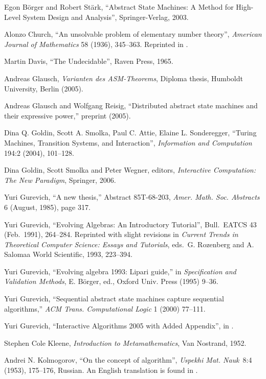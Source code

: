 \documentclass{LMCS}
\theoremstyle{definition}
\begin{document}
\begin{thebibliography}{99}
 Egon B\"orger and Robert St\"ark, ``Abstract State
Machines: A Method for High-Level System Design and Analysis'',
Springer-Verlag, 2003.

Alonzo Church, ``An unsolvable problem of
 elementary number theory'', {\it American Journal of Mathematics} 58
 (1936), 345--363.  Reprinted in {\cite[88--107]{Davis65}}.

 Martin Davis, ``The Undecidable'', Raven Press,
  1965.

Andreas Glausch, \emph{Varianten des ASM-Theorems}, Diploma thesis,
Humboldt University, Berlin (2005).

Andreas Glausch and Wolfgang Reisig, ``Distributed abstract state
machines and their expressive power,'' preprint (2005).

 Dina Q. Goldin, Scott A. Smolka, Paul C. Attie, Elaine
  L. Sonderegger, ``Turing Machines, Transition Systems, and
  Interaction'', \emph{Information and Computation} 194:2 (2004),
  101--128.

 Dina Goldin, Scott Smolka and Peter Wegner, editors,
\emph{Interactive Computation: The New Paradigm}, Springer, 2006.

Yuri Gurevich, ``A new thesis,'' Abstract 85T-68-203,
\emph{Amer. Math. Soc. Abstracts} 6 (August, 1985), page 317.

 Yuri Gurevich, ``Evolving Algebras: An Introductory
  Tutorial'', Bull.\ EATCS 43 (Feb.\ 1991), 264--284.  Reprinted with
  slight revisions in \emph{Current Trends in Theoretical Computer
    Science: Essays and Tutorials}, eds.\ G. Rozenberg and A. Salomaa
  World Scientific, 1993, 223--394.

Yuri Gurevich, ``Evolving algebra 1993: Lipari guide,'' in
\emph{Specification and Validation Methods}, E. B\"orger, ed., Oxford
Univ. Press (1995) 9--36.

Yuri Gurevich, ``Sequential abstract state machines capture sequential
algorithms,'' \emph{ACM Trans. Computational Logic} 1 (2000) 77--111.

 Yuri Gurevich, ``Interactive Algorithms 2005 with Added
Appendix'', in \cite{gsw}.

 Stephen Cole Kleene, \emph{Introduction to
  Metamathematics},  Van Nostrand, 1952.

 Andrei N. Kolmogorov, ``On the concept of algorithm'',
 {\it Uspekhi Mat. Nauk}~8:4 (1953), 175--176, Russian.  An English
 translation is found in {\cite[pages 18--19]{US93}}.


\end{thebibliography}
\end{document}
